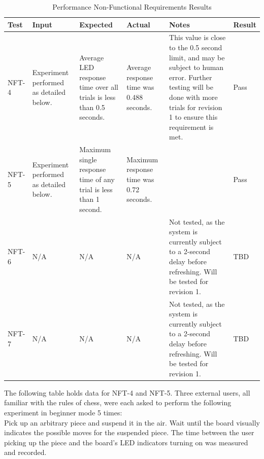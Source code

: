 \documentclass[12pt, titlepage]{article}
\begin{document}
\begin{table}[H]
    \centering
        \setlength{\leftmargini}{0cm}
        \begin{tabular}{| >{\centering\arraybackslash}m{2cm} | 
            >{\centering\arraybackslash}m{2.5cm} | 
            >{\centering\arraybackslash}m{3cm} | 
            >{\centering\arraybackslash}m{2cm} |
            >{\centering\arraybackslash}m{4cm} |
            >{\centering\arraybackslash}m{1.5cm} |}
        \hline
        \rowcolor[gray]{0.9}
        Test & Input & Expected & Actual & Notes & Result\\
        \hline
        NFT-4 & Experiment performed as detailed below. & Average LED response time over all trials is less than 0.5 seconds. & Average response time was 0.488 seconds. & This value is close to the 0.5 second limit, and may be subject to human error. Further testing will be done with more trials for revision 1 to ensure this requirement is met. & Pass \\
        \hline
        NFT-5 & Experiment performed as detailed below. & Maximum single response time of any trial is less than 1 second. & Maximum response time was 0.72 seconds. &  & Pass \\
        \hline
        NFT-6 & N/A & N/A & N/A & Not tested, as the system is currently subject to a 2-second delay before refreshing. Will be tested for revision 1. & TBD \\
        \hline
        NFT-7 & N/A & N/A & N/A & Not tested, as the system is currently subject to a 2-second delay before refreshing. Will be tested for revision 1. & TBD \\
        \hline
        \end{tabular}
    \caption{Performance Non-Functional Requirements Results}
\end{table}

\newpage
The following table holds data for NFT-4 and NFT-5. Three external users, all familiar with the rules of chess, were each asked to perform the following experiment in beginner mode 5 times:
\medskip
\\
Pick up an arbitrary piece and suspend it in the air. Wait until the board visually indicates the possible moves for the suspended piece. The time between the user picking up 
the piece and the board's LED indicators turning on was measured and recorded.
\end{document}
